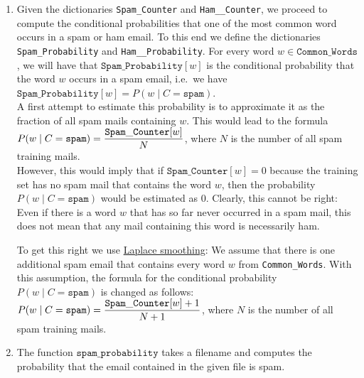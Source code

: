 \begin{enumerate}
\item Given the dictionaries \texttt{Spam\_Counter} and \texttt{Ham\_\_Counter}, we proceed to compute 
      the conditional probabilities that one of the most common word occurs in a spam or ham email.
      To this end we define the dictionaries \texttt{Spam\_Probability} and  \texttt{Ham\_\_Probability}.
      For every word $w \in \mathtt{Common\_Words}$, we will have that
      $\texttt{Spam\_Probability}[w]$ is the conditional probability that the word $w$ occurs in a spam email,
      i.e.~we have
      \\[0.2cm]
      \hspace*{1.3cm}
      $\texttt{Spam\_Probability}[w] = P(w \mid C = \mathtt{spam})$.
      \\[0.2cm]
      A first attempt to estimate this probability is to approximate it as the fraction of all spam mails
      containing $w$.  This would lead to the formula
      \\[0.2cm]
      \hspace*{1.3cm}
      $\displaystyle P(w \mid C = \mathtt{spam}) = \frac{\mathtt{Spam\_Counter}[w]}{N}$, \quad where $N$ is the number of
      all spam training mails.
      \\[0.2cm]
      However, this would imply that if $\mathtt{Spam\_Counter}[w] = 0$ because the training set has no spam
      mail that contains the word $w$, then the probability $P(w \mid C = \mathtt{spam})$ would be estimated as
      $0$.  Clearly, this cannot be right:  Even if there is a word $w$ that has so far never occurred in a
      spam mail, this does not mean that any mail containing this word is necessarily ham.

      To get this right we use \href{https://en.wikipedia.org/wiki/Additive_smoothing}{Laplace smoothing}:
      We assume that there is one additional spam email that contains every word $w$ from
      \texttt{Common\_Words}.
      With this assumption, the formula for the conditional probability $P(w \mid C = \mathtt{spam})$ is
      changed as follows:
      \\[0.2cm]
      \hspace*{1.3cm}
      $\displaystyle P(w \mid C = \mathtt{spam}) = \frac{\mathtt{Spam\_Counter}[w]+1}{N+1}$, 
      \quad where $N$ is the number of all spam training mails.
\item The function $\mathtt{spam\_probability}$ takes a filename and computes the probability that the email
      contained in the given file is spam.


\end{enumerate}
